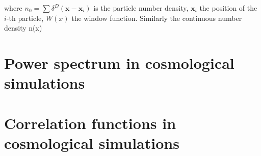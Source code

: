 where $n_0 = \sum \delta^D ( \textbf{x} - \textbf{x}_i )$ is the particle number density,
$\textbf{x}_i$ the position of the $i$-th particle, $W(x)$ the window function. 
Similarly the continuous number density n(x) 






\section{ Power spectrum in cosmological simulations }

\section{ Correlation functions in cosmological simulations }



